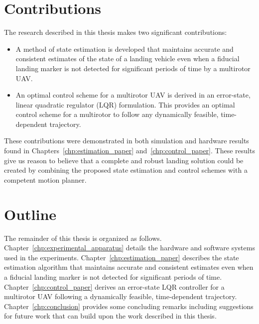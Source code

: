 \section{Contributions}
The research described in this thesis makes two significant contributions:
\begin{itemize}
\item A method of state estimation is developed that maintains accurate and
  consistent estimates of the state of a landing vehicle even when a fiducial landing
  marker is not detected for significant periods of time by a multirotor UAV.
\item An optimal control scheme for a multirotor UAV is derived in an error-state, linear
  quadratic regulator (LQR) formulation. This provides an optimal control scheme
  for a multirotor to follow any dynamically feasible, time-dependent
  trajectory.
\end{itemize}

These contributions were demonstrated in both simulation and hardware
results found in Chapters~\ref{chp:estimation_paper}
and~\ref{chp:control_paper}. These results give us reason to believe that a
complete and robust landing solution could be created by combining the proposed
state estimation and control schemes with a competent motion planner.

\section{Outline}

The remainder of this thesis is organized as follows.
Chapter~\ref{chp:experimental_apparatus} details the hardware and software
systems used
in the experiments. Chapter~\ref{chp:estimation_paper} describes the state
estimation algorithm that maintains accurate and consistent estimates even when
a fiducial landing marker is not detected for significant periods of time.
Chapter~\ref{chp:control_paper} derives an error-state LQR controller for a
multirotor UAV following a dynamically feasible, time-dependent trajectory.
Chapter~\ref{chp:conclusion} provides some concluding remarks including
suggestions for future work that can build upon the work described in this
thesis.
